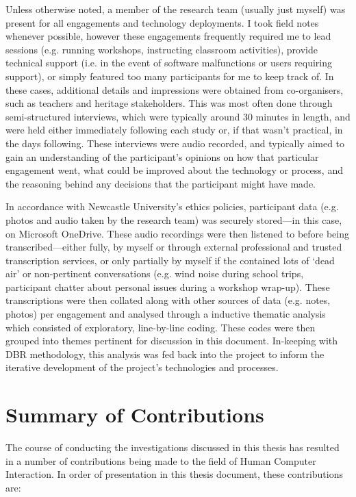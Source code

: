 Unless otherwise noted, a member of the research team (usually just myself) was present for all engagements and technology deployments. I took field notes whenever possible, however these engagements frequently required me to lead sessions (e.g. running workshops, instructing classroom activities), provide technical support (i.e. in the event of software malfunctions or users requiring support), or simply featured too many participants for me to keep track of. In these cases, additional details and impressions were obtained from co-organisers, such as teachers and heritage stakeholders. This was most often done through semi-structured interviews, which were typically around 30 minutes in length, and were held either immediately following each study or, if that wasn't practical, in the days following. These interviews were audio recorded, and typically aimed to gain an understanding of the participant's opinions on how that particular engagement went, what could be improved about the technology or process, and the reasoning behind any decisions that the participant might have made.

In accordance with Newcastle University's ethics policies, participant data (e.g. photos and audio taken by the research team) was securely stored---in this case, on Microsoft OneDrive. These audio recordings were then listened to before being transcribed---either fully, by myself or through external professional and trusted transcription services, or only partially by myself if the contained lots of `dead air' or non-pertinent conversations (e.g. wind noise during school trips, participant chatter about personal issues during a workshop wrap-up). These transcriptions were then collated along with other sources of data (e.g. notes, photos) per engagement and analysed through a inductive thematic analysis which consisted of exploratory, line-by-line coding. These codes were then grouped into themes pertinent for discussion in this document. In-keeping with DBR methodology, this analysis was fed back into the project to inform the iterative development of the project's technologies and processes.

\section{Summary of Contributions}
The course of conducting the investigations discussed in this thesis has resulted in a number of contributions being made to the field of Human Computer Interaction. In order of presentation in this thesis document, these contributions are:

